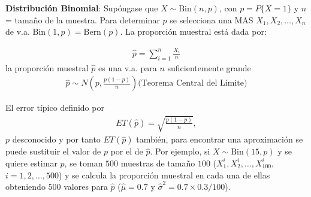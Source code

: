 \begin{Ejer}
\begin{enumerate}
\end{enumerate}
\end{Ejer}

\begin{Ejem} \textbf{Distribuci\'on Binomial}: Sup\'ongase que $X \sim \textrm{Bin}(n,p)$, con $p = P\{X=1\}$ y $n$ = tama\~no de la muestra. Para determinar $p$ se selecciona una MAS $X_1, X_2, \ldots, X_n$ de v.a. $\textrm{Bin}(1,p)=\text{Bern}(p)$. La proporci\'on muestral est\'a dada por:

\begin{eqnarray*}
\hat{p} = \sum_{i=1}^n \frac{X_i}{n}
\end{eqnarray*}
la proporci\'on muestral $\hat{p}$ es una v.a. para $n$ suficientemente grande
\begin{eqnarray*}
\hat{p} \sim N\left(p,\frac{p(1-p)}{n}\right) \textrm{(Teorema Central del L\'imite)}
\end{eqnarray*}


El error t\'ipico definido por
\begin{eqnarray*}
ET(\hat{p}) = \sqrt{\frac{p(1-p)}{n}},
\end{eqnarray*}
$p$ desconocido y por tanto $ET(\hat{p})$ tambi\'en, para encontrar una aproximaci\'on se puede sustituir el valor de $p$ por el de $\hat{p}$. Por ejemplo, si $X \sim \text{Bin}(15,p)$ y se quiere estimar $p$,  se toman $500$ muestras de tama\~no $100$ ($X_{1}^{i},X_{2}^{i},\ldots,X_{100}^{i}$, $i=1,2,\ldots,500$) y se calcula la proporci\'on muestral en cada una de ellas obteniendo $500$ valores para $\hat{p}$ ($\hat{\mu}=0.7$ y $\hat{\sigma}^{2}=0.7\times0.3/100$).

\end{Ejem}

